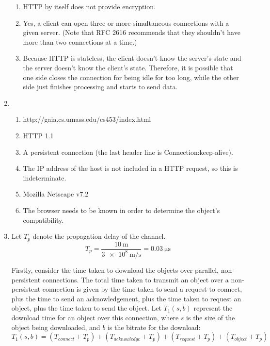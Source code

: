 \documentclass{article}
\begin{document}
\begin{enumerate}
\begin{enumerate}
\item HTTP by itself does not provide encryption.

\item Yes, a client can open three or more simultaneous connections with a given server. (Note that RFC 2616 recommends that they shouldn't have more than two connections at a time.)

\item Because HTTP is stateless, the client doesn't know the server's state and the server doesn't know the client's state. Therefore, it is possible that one side closes the connection for being idle for too long, while the other side just finishes processing and starts to send data.

\end{enumerate}

\item
\begin{enumerate}

\item http://gaia.cs.umass.edu/cs453/index.html

\item HTTP 1.1

\item A persistent connection (the last header line is Connection:keep-alive).

\item The IP address of the host is not included in a HTTP request, so this is indeterminate.

\item Mozilla Netscape v7.2

\item The browser needs to be known in order to determine the object's compatibility.

\end{enumerate}

\item Let $ T_p $ denote the propagation delay of the channel.
$$ T_p = \frac{\SI{10}{\metre}}{\SI{3e8}{\metre\per\second}} = \SI{0.03}{\micro\second} $$

Firstly, consider the time taken to download the objects over parallel, non-persistent connections. The total time taken to transmit an object over a non-persistent connection is given by the time taken to send a request to connect, plus the time to send an acknowledgement, plus the time taken to request an object, plus the time taken to send the object. Let $ T_1(s, b) $ represent the download time for an object over this connection, where $ s $ is the size of the object being downloaded, and $ b $ is the bitrate for the download:
$$ T_1(s,b) = (T_{connect} + T_p) + (T_{acknowledge} + T_p) + (T_{request} + T_p) + (T_{object} + T_p) $$


\end{enumerate}
\end{document}
